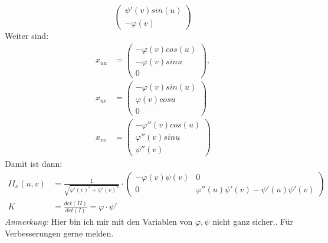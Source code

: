 \begin{problem*}[2a]
\begin{equation*}
\begin{pmatrix}
	\psi'(v) sin(u) \\
	-\varphi(v)
	\end{pmatrix}
\end{equation*}
Weiter sind:
\begin{align*}
x_{ uu } &= \begin{pmatrix}
-\varphi(v)cos(u) \\
-\varphi(v) sinu \\
0
\end{pmatrix}, \\
x_{ uv } &= \begin{pmatrix}
-\varphi(v)sin(u) \\
\varphi(v) cosu \\
0
\end{pmatrix} \\
x_{ vv } &= \begin{pmatrix}
-\varphi''(v)cos(u) \\
\varphi''(v) sinu \\
\psi''(v)
\end{pmatrix}	
\end{align*}
Damit ist dann: 
\begin{align*}
	II_x(u,v) &= \frac{1}{\sqrt{ \varphi'(v)^2 + \psi'(v)^2 }} \cdot \begin{pmatrix}
	-\varphi(v) \psi(v) & 0 \\
	0 & \varphi''(u) \psi'(v) - \psi'(u)\psi'(v)
	\end{pmatrix}\\ 
	K &= \frac{det(II)}{det(I)} = \varphi \cdot \psi'
\end{align*}
\emph{Anmerkung:} Hier bin ich mir mit den Variablen von $\varphi, \psi$ nicht ganz sicher.. Für Verbesserungen gerne melden.
\end{problem*}

